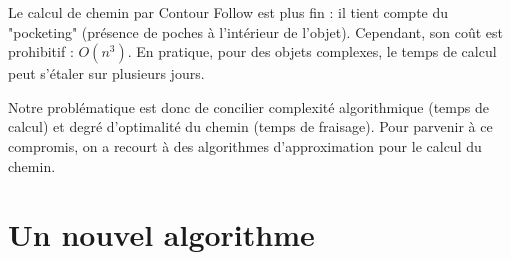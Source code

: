 \documentclass{article}
\begin{document}
Le calcul de chemin par Contour Follow est plus fin : il tient compte du "pocketing" (présence de poches à l'intérieur de l'objet). Cependant, son coût est prohibitif : $O(n^{3})$. En pratique, pour des objets complexes, le temps de calcul peut s'étaler sur plusieurs jours.

Notre problématique est donc de concilier complexité algorithmique (temps de calcul) et degré d'optimalité du chemin (temps de fraisage). Pour parvenir à ce compromis, on a recourt à des algorithmes d'approximation pour le calcul du chemin.

\section{Un nouvel algorithme}
\end{document}
